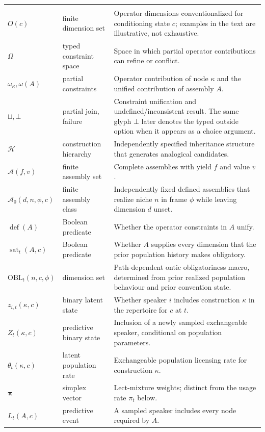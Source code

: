 \begin{longtable}{@{}>{\raggedright\arraybackslash}p{}
  >{\raggedright\arraybackslash}p{}
  >{\raggedright\arraybackslash}p{}@{}}
\multicolumn{3}{@{}l}{\textsc{Constraint structure and state theory}}\\[2pt]
$O(c)$ & finite dimension set & Operator dimensions conventionalized for conditioning state $c$; examples in the text are illustrative, not exhaustive. \\
$\Omega$ & typed constraint space & Space in which partial operator contributions can refine or conflict. \\
$\omega_\kappa,\omega(A)$ & partial constraints & Operator contribution of node $\kappa$ and the unified contribution of assembly $A$. \\
$\sqcup,\bot$ & partial join, failure & Constraint unification and undefined/inconsistent result. The same glyph $\bot$ later denotes the typed outside option when it appears as a choice argument. \\
$\mathcal H$ & construction hierarchy & Independently specified inheritance structure that generates analogical candidates. \\
$\mathcal A(f,v)$ & finite assembly set & Complete assemblies with yield $f$ and value $v$. \\
$\mathcal A_0(d,n,\phi,c)$ & finite assembly class & Independently fixed defined assemblies that realize niche $n$ in frame $\phi$ while leaving dimension $d$ unset. \\
$\operatorname{def}(A)$ & Boolean predicate & Whether the operator constraints in $A$ unify. \\
$\operatorname{sat}_t(A,c)$ & Boolean predicate & Whether $A$ supplies every dimension that the prior population history makes obligatory. \\
$\mathrm{OBL}_t(n,c,\phi)$ & dimension set & Path-dependent ontic obligatoriness macro, determined from prior realized population behaviour and prior convention state. \\
$z_{i,t}(\kappa,c)$ & binary latent state & Whether speaker $i$ includes construction $\kappa$ in the repertoire for $c$ at $t$. \\
$Z_t(\kappa,c)$ & predictive binary state & Inclusion of a newly sampled exchangeable speaker, conditional on population parameters. \\
$\theta_t(\kappa,c)$ & latent population rate & Exchangeable population licensing rate for construction $\kappa$. \\
$\boldsymbol\pi$ & simplex vector & Lect-mixture weights; distinct from the usage rate $\pi_t$ below. \\
$L_t(A,c)$ & predictive event & A sampled speaker includes every node required by $A$. \\

\end{longtable}
